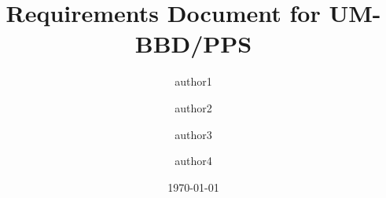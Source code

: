 \documentclass{book}
\title{Requirements Document for UM-BBD/PPS}
\author{author1 \and author2 \and author3 \and author4}
\date{\today}
\begin{document}

\maketitle


\printglossaries

\tableofcontents




\end{document}

